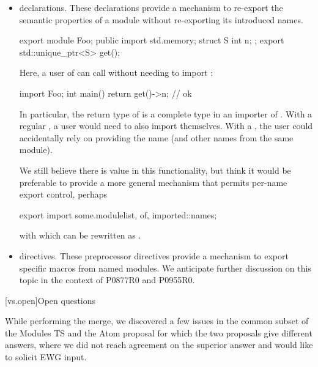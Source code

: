 \begin{itemize}
\item
{} declarations.
These declarations provide a mechanism to re-export
the semantic properties of a module
without re-exporting its introduced names.
\begin{example}
\begin{codeblock}
export module Foo;
public import std.memory;
struct S { int n; };
export std::unique_ptr<S> get();
\end{codeblock}

Here, a user of 
can call  without needing to
import :

\begin{codeblock}
import Foo;
int main() { return get()->n; } // ok
\end{codeblock}

In particular,
the return type of  is a complete type
in an importer of .
With a regular ,
a user would need to also import  themselves.
With a ,
the user could accidentally rely on
 providing the name
 (and other names from the same module).
\end{example}

We still believe there is value in this functionality,
but think it would be preferable to provide
a more general mechanism that permits
per-name export control, perhaps

\begin{codeblock}
export import some.module{list, of, imported::names};
\end{codeblock}

with which 
can be rewritten as
.

\item
{} directives.
These preprocessor directives provide a mechanism
to export specific macros from named modules.
We anticipate further discussion on this topic
in the context of P0877R0 and P0955R0.
\end{itemize}

[vs.open]{Open questions}

\pnum
While performing the merge, we discovered a few issues
in the common subset of the Modules TS and the Atom proposal
for which the two proposals give different answers,
where we did not reach agreement on the superior answer
and would like to solicit EWG input.

